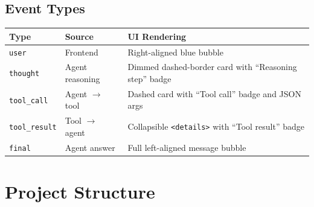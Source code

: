 \documentclass[11pt,a4paper]{article}
\begin{document}
\subsection{Event Types}

\begin{table}[h!]
\centering
\begin{tabular}{@{}llp{6cm}@{}}
\toprule
\textbf{Type} & \textbf{Source} & \textbf{UI Rendering} \\
\midrule
\texttt{user} & Frontend & Right-aligned blue bubble \\
\texttt{thought} & Agent reasoning & Dimmed dashed-border card with ``Reasoning step'' badge \\
\texttt{tool\_call} & Agent $\to$ tool & Dashed card with ``Tool call'' badge and JSON args \\
\texttt{tool\_result} & Tool $\to$ agent & Collapsible \texttt{<details>} with ``Tool result'' badge \\
\texttt{final} & Agent answer & Full left-aligned message bubble \\
\bottomrule
\end{tabular}
\end{table}

\section{Project Structure}
\end{document}
